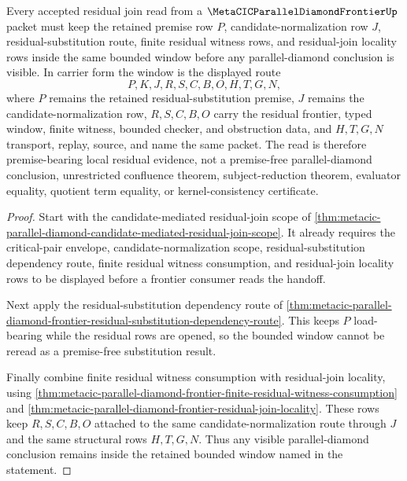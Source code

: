 \begin{theorem}
\label{thm:metacic-parallel-diamond-frontier-candidate-mediated-residual-window}
Every accepted residual join read from a $\MetaCICParallelDiamondFrontierUp$ packet must keep the retained premise row $P$, candidate-normalization row $J$, residual-substitution route, finite residual witness rows, and residual-join locality rows inside the same bounded window before any parallel-diamond conclusion is visible. In carrier form the window is the displayed route
$$
P,K,J,R,S,C,B,O,H,T,G,N ,
$$
where $P$ remains the retained residual-substitution premise, $J$ remains the candidate-normalization row, $R,S,C,B,O$ carry the residual frontier, typed window, finite witness, bounded checker, and obstruction data, and $H,T,G,N$ transport, replay, source, and name the same packet. The read is therefore premise-bearing local residual evidence, not a premise-free parallel-diamond conclusion, unrestricted confluence theorem, subject-reduction theorem, evaluator equality, quotient term equality, or kernel-consistency certificate.
\end{theorem}
\begin{proof}
Start with the candidate-mediated residual-join scope of \autoref{thm:metacic-parallel-diamond-candidate-mediated-residual-join-scope}. It already requires the critical-pair envelope, candidate-normalization scope, residual-substitution dependency route, finite residual witness consumption, and residual-join locality rows to be displayed before a frontier consumer reads the handoff.

Next apply the residual-substitution dependency route of \autoref{thm:metacic-parallel-diamond-frontier-residual-substitution-dependency-route}. This keeps $P$ load-bearing while the residual rows are opened, so the bounded window cannot be reread as a premise-free substitution result.

Finally combine finite residual witness consumption with residual-join locality, using \autoref{thm:metacic-parallel-diamond-frontier-finite-residual-witness-consumption} and \autoref{thm:metacic-parallel-diamond-frontier-residual-join-locality}. These rows keep $R,S,C,B,O$ attached to the same candidate-normalization route through $J$ and the same structural rows $H,T,G,N$. Thus any visible parallel-diamond conclusion remains inside the retained bounded window named in the statement.
\end{proof}

